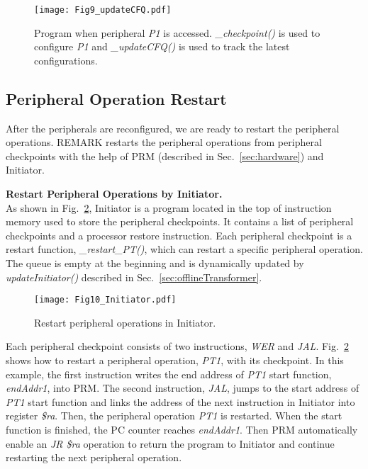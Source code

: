 %
\begin{figure}[t]
    \centering
    \vspace{0pt}
    \texttt{[image: Fig9\_updateCFQ.pdf]}
    \vspace{-15pt}
    \caption{Program when peripheral \emph{P1} is accessed. \emph{\_checkpoint()} is used to configure \emph{P1} and \emph{\_updateCFQ()} is used to track the latest configurations.}
    \vspace{-5pt}
    \label{fig:updateCFQ}
\end{figure}


\subsection{Peripheral Operation Restart} \label{sec:onlineRestart}
\vspace{-5pt}
%
After the peripherals are reconfigured, we are ready to restart the peripheral operations.
REMARK restarts the peripheral operations from peripheral checkpoints with the help of PRM (described in Sec.~\ref{sec:hardware}) and Initiator.


\vspace{5pt}
\noindent\textbf{Restart Peripheral Operations by Initiator.} \\
As shown in Fig.~\ref{fig:Initiator}, Initiator is a program located in the top of instruction memory used to store the peripheral checkpoints.
It contains a list of peripheral checkpoints and a processor restore instruction.
Each peripheral checkpoint is a restart function, \emph{\_restart\_PT()}, which can restart a specific peripheral operation.
The queue is empty at the beginning and is dynamically updated by \emph{updateInitiator()} described in Sec.~\ref{sec:offlineTransformer}.

%
\begin{figure}[t]
    \centering
    \texttt{[image: Fig10\_Initiator.pdf]}
    \vspace{-15pt}
    \caption{Restart peripheral operations in Initiator.}
    \vspace{-1pt}
    \label{fig:Initiator}
\end{figure}

Each peripheral checkpoint consists of two instructions, \emph{WER} and \emph{JAL}.
Fig.~\ref{fig:Initiator} shows how to restart a peripheral operation, \emph{PT1}, with its checkpoint.
In this example, the first instruction writes the end address of \emph{PT1} start function, \emph{endAddr1}, into PRM.
The second instruction, \emph{JAL}, jumps to the start address of \emph{PT1} start function and links the address of the next instruction in Initiator into register \emph{\$ra}.
Then, the peripheral operation \emph{PT1} is restarted.
When the start function is finished, the PC counter reaches \emph{endAddr1}.
Then PRM automatically enable an \emph{JR \$ra} operation to return the program to Initiator and continue restarting the next peripheral operation.

